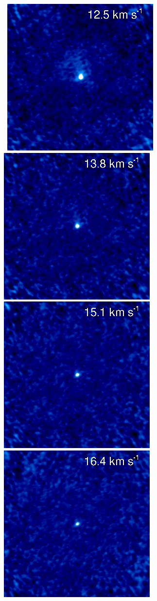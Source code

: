 \documentclass[preprint2]{aastex}
\begin{document}
\\
\clearpage
\\
\begin{figure}[hbt!]
\mbox{
          \includegraphics[]{chan17.ps}
          \includegraphics[]{chan16.ps}
          \includegraphics[]{chan15.ps}
          \includegraphics[]{chan14.ps}
}
\end{figure}
\end{document}
